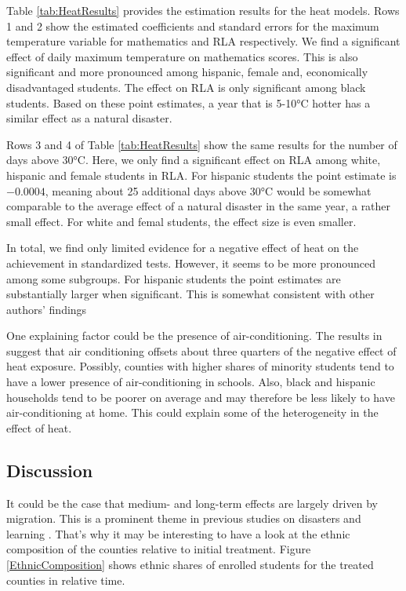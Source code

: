 Table \ref{tab:HeatResults} provides the estimation results for the heat models. Rows 1 and 2 show the estimated coefficients and standard errors for the maximum temperature variable for mathematics and RLA respectively. We find a significant effect of daily maximum temperature on mathematics scores. This is also significant and more pronounced among hispanic, female and, economically disadvantaged students. The effect on RLA is only significant among black students. Based on these point estimates, a year that is 5-10°C hotter has a similar effect as a natural disaster.



Rows 3 and 4 of Table \ref{tab:HeatResults} show the same results for the number of days above 30°C. Here, we only find a significant effect on RLA among white, hispanic and female students in RLA. For hispanic students the point estimate is $-0.0004$, meaning about 25 additional days above 30°C would be somewhat comparable to the average effect of a natural disaster in the same year, a rather small effect. For white and femal students, the effect size is even smaller.

In total, we find only limited evidence for a negative effect of heat on the achievement in standardized tests. However, it seems to be more pronounced among some subgroups. For hispanic students the point estimates are substantially larger when significant. This is somewhat consistent with other authors' findings \citep[for example][]{Goodman_2020}

One explaining factor could be the presence of air-conditioning. The results in \cite{Goodman_2020} suggest that air conditioning offsets about three quarters of the negative effect of heat exposure. Possibly, counties with higher shares of minority students tend to have a lower presence of air-conditioning in schools. Also, black and hispanic households tend to be poorer on average and may therefore be less likely to have air-conditioning at home. This could explain some of the heterogeneity in the effect of heat.

\subsection{Discussion}

It could be the case that medium- and long-term effects are largely driven by migration. This is a prominent theme in previous studies on disasters and learning \citep{Pane_2008, Sacerdote_2012}. That's why it may be interesting to have a look at the ethnic composition of the counties relative to initial treatment. Figure \ref{EthnicComposition} shows ethnic shares of enrolled students for the treated counties in relative time.

